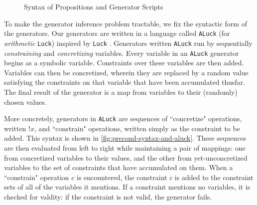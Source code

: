 \documentclass[sigconf,nonacm,review,anonymous]{acmart}
\begin{document}
\begin{figure}
\vspace{-10px}
\caption{Syntax of Propositions and Generator Scripts}
\label{fig:precond-syntax-and-aluck}

\vspace{-15px}
\end{figure}

To make the generator inference problem tractable, we fix the
syntactic form of the generators. Our generators are written
in a language called \texttt{ALuck} (for \textit{arithmetic} \texttt{Luck})
inspired by \texttt{Luck} \cite{luck}. Generators written \texttt{ALuck} run by sequentially \textit{constraining} and
\textit{concretizing} variables. Every variable in an \texttt{ALuck} generator
begins as a symbolic variable. Constraints over these variables are then added.
Variables can then be concretized, wherein they are replaced by a random value
satisfying the constraints on that variable that have been accumulated thusfar.
The final result of the generator is a map from variables to their (randomly)
chosen values.

More concretely, generators in \texttt{ALuck} are sequences of ``concretize"
operations, written $!x$, and ``constrain" operations, written simply as the
constraint to be added. This syntax is shown in
\autoref{fig:precond-syntax-and-aluck}. These sequences are then evaluated from left to
right while maintaining a pair of mappings: one from concretized variables to
their values, and the other from yet-unconcretized variables to the set of
constraints that have accumulated on them.  When a ``constrain" operation $c$ is
encountered, the constraint $c$ is added to the constraint sets of all of the
variables it mentions. If a constraint mentions no variables, it is checked for
valdity: if the constraint is not valid, the generator fails.
\end{document}
